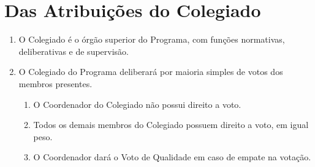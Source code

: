 \documentclass{article}
\begin{document}
\section{Das Atribuições do Colegiado}
\begin{enumerate}

	\item O Colegiado é o órgão superior do Programa, com funções normativas, deliberativas e de supervisão.
	\item O Colegiado do Programa deliberará por maioria simples de votos dos membros presentes.
	\begin{enumerate}
		\item O Coordenador do Colegiado não possui direito a voto.
		\item Todos os demais membros do Colegiado possuem direito a voto, em igual peso.
		\item O Coordenador dará o Voto de Qualidade em caso de empate na votação. %
	\end{enumerate}



\end{enumerate}
\end{document}
